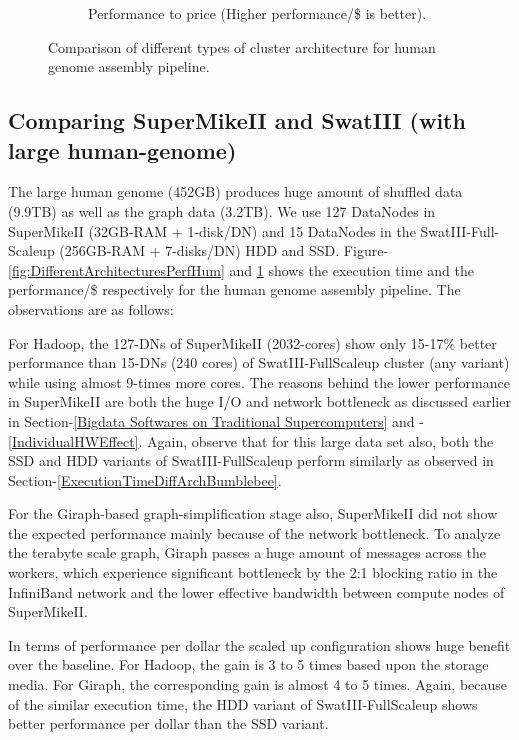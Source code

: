 \documentclass[conference]{IEEEtran}
\begin{document}
\begin{figure}[htb]
\begin{subfigure}[b]{0.23\textwidth}
                \caption{Performance to price (Higher performance/\$ is better).}
                \label{fig:DifferentArchitecturesPerfPerDollarHum}
        \end{subfigure}
        \caption{Comparison of different types of cluster architecture for human genome assembly pipeline.}
  \label{fig:DifferentArchitecturesHum}
  \vspace{-.8em}
\end{figure}
\subsection {Comparing SuperMikeII and SwatIII (with large human-genome)} \label{SecPerfDiffArchHum}
The large human genome (452GB)  produces huge amount of shuffled data (9.9TB) as well as the graph data (3.2TB). We use 127 DataNodes in SuperMikeII (32GB-RAM + 1-disk/DN) and 15 DataNodes in the SwatIII-Full-Scaleup (256GB-RAM + 7-disks/DN) HDD and SSD. Figure-\ref{fig:DifferentArchitecturesPerfHum} and \ref{fig:DifferentArchitecturesPerfPerDollarHum} shows the execution time and the performance/\$ respectively for the human genome assembly pipeline. The observations are as follows:
\begin{inparaenum}[\itshape 1\upshape)]
\item For Hadoop, the 127-DNs of SuperMikeII (2032-cores) show only 15-17\% better performance than 15-DNs (240 cores) of SwatIII-FullScaleup cluster (any variant) while using almost 9-times more cores. The reasons behind the lower performance in SuperMikeII are both the huge I/O and network bottleneck as discussed earlier in Section-\ref{Bigdata Softwares on Traditional Supercomputers} and -\ref{IndividualHWEffect}. Again, observe that for this large data set also, both the SSD and HDD variants of SwatIII-FullScaleup perform similarly as observed in Section-\ref{ExecutionTimeDiffArchBumblebee}.
\item For the Giraph-based graph-simplification stage also, SuperMikeII did not show the expected performance mainly because of the network bottleneck. To analyze the terabyte scale graph, Giraph passes a huge amount of messages across the workers, which experience significant bottleneck by the 2:1 blocking ratio in the InfiniBand network and the lower effective bandwidth between compute nodes of SuperMikeII.  
\item In terms of performance per dollar the scaled up configuration shows huge benefit over the baseline. For Hadoop, the gain is 3 to 5 times based upon the storage media. For Giraph, the corresponding gain is almost 4 to 5 times.  Again, because of the similar execution time, the HDD variant of SwatIII-FullScaleup shows better performance per dollar than the SSD variant.
\end{inparaenum}
\end{document}
